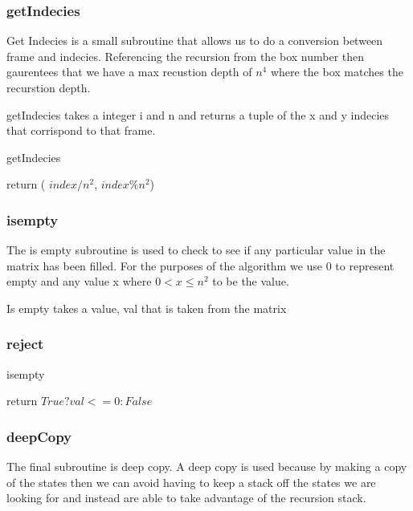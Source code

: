 \documentclass{sig-alternate}
\begin{document}
\subsubsection{getIndecies}
Get Indecies is a small subroutine that allows us to do a conversion between frame and indecies. Referencing the
recursion from the box number then gaurentees that we have a max recustion depth of $n^4$ where the box matches the recurstion depth. 

getIndecies takes a integer i and n and returns a tuple of the x and y indecies that corrispond to that frame.

\begin{algorithm}
\caption{getIndecies}\label{getIndecies}
\begin{algorithmic}[1]

\State return ( $index / n^2$, $index \% n^2$)

\EndProcedure
\end{algorithmic}
\end{algorithm}


\subsubsection{isempty}

The is empty subroutine is used to check to see if any particular value in the matrix has been filled. 
For the purposes of the algorithm we use 0 to represent empty and any value x where $0 < x \le n^2$ to be the value.

Is empty takes a value, val that is taken from the matrix
\subsubsection{reject}

\begin{algorithm}
\caption{isempty}\label{isempty}
\begin{algorithmic}[1]

\State return $True ? val <= 0 : False$
\EndProcedure
\end{algorithmic}
\end{algorithm}



\subsubsection{deepCopy}
The final subroutine is deep copy. A deep copy is used because by making a copy of the states then we can avoid having
to keep a stack off the states we are looking for and instead are able to take advantage of the recursion stack.
\end{document}
